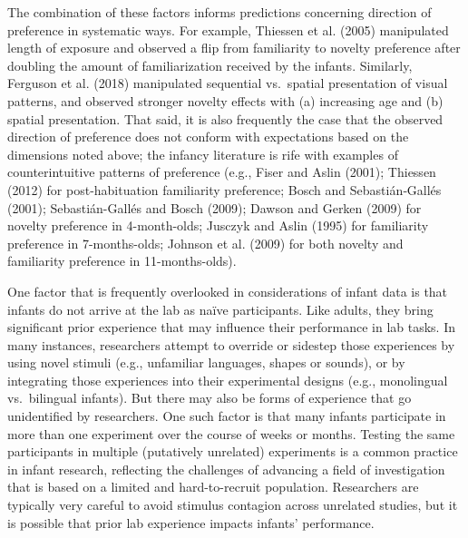 \documentclass[english,man,man,floatsintext]{apa6}
\begin{document}
The combination of these factors informs predictions concerning direction of preference in systematic ways. For example, Thiessen et al. (2005) manipulated length of exposure and observed a flip from familiarity to novelty preference after doubling the amount of familiarization received by the infants. Similarly, Ferguson et al. (2018) manipulated sequential vs.~spatial presentation of visual patterns, and observed stronger novelty effects with (a) increasing age and (b) spatial presentation. That said, it is also frequently the case that the observed direction of preference does not conform with expectations based on the dimensions noted above; the infancy literature is rife with examples of counterintuitive patterns of preference (e.g., Fiser and Aslin (2001); Thiessen (2012) for post-habituation familiarity preference; Bosch and Sebastián‐Gallés (2001); Sebastián-Gallés and Bosch (2009); Dawson and Gerken (2009) for novelty preference in 4-month-olds; Jusczyk and Aslin (1995) for familiarity preference in 7-months-olds; Johnson et al. (2009) for both novelty and familiarity preference in 11-months-olds).

One factor that is frequently overlooked in considerations of infant data is that infants do not arrive at the lab as naïve participants. Like adults, they bring significant prior experience that may influence their performance in lab tasks. In many instances, researchers attempt to override or sidestep those experiences by using novel stimuli (e.g., unfamiliar languages, shapes or sounds), or by integrating those experiences into their experimental designs (e.g., monolingual vs.~bilingual infants). But there may also be forms of experience that go unidentified by researchers. One such factor is that many infants participate in more than one experiment over the course of weeks or months. Testing the same participants in multiple (putatively unrelated) experiments is a common practice in infant research, reflecting the challenges of advancing a field of investigation that is based on a limited and hard-to-recruit population. Researchers are typically very careful to avoid stimulus contagion across unrelated studies, but it is possible that prior lab experience impacts infants' performance.
\end{document}

